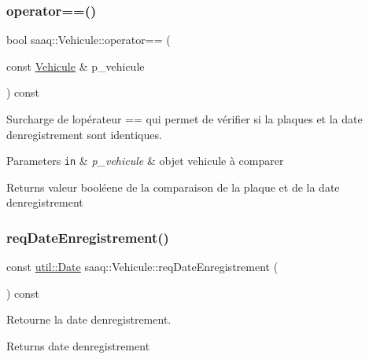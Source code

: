 \subsubsection{\texorpdfstring{operator==()}{operator==()}}
{\footnotesize\ttfamily bool saaq\+::\+Vehicule\+::operator== (\begin{DoxyParamCaption}\item[{const \hyperlink{classsaaq_1_1Vehicule}{Vehicule} \&}]{p\+\_\+vehicule }\end{DoxyParamCaption}) const}



Surcharge de l\textquotesingle{}opérateur == qui permet de vérifier si la plaques et la date d\textquotesingle{}enregistrement sont identiques. 


\begin{DoxyParams}[1]{Parameters}
\mbox{\tt in}  & {\em p\+\_\+vehicule} & objet vehicule à comparer \\
\hline
\end{DoxyParams}
\begin{DoxyReturn}{Returns}
valeur booléene de la comparaison de la plaque et de la date d\textquotesingle{}enregistrement 
\end{DoxyReturn}
\mbox{\label{classsaaq_1_1Vehicule_a650c5f764375e344e268391a5c3cf8b3}} 
\subsubsection{\texorpdfstring{req\+Date\+Enregistrement()}{reqDateEnregistrement()}}
{\footnotesize\ttfamily const \hyperlink{classutil_1_1Date}{util\+::\+Date} saaq\+::\+Vehicule\+::req\+Date\+Enregistrement (\begin{DoxyParamCaption}{ }\end{DoxyParamCaption}) const}



Retourne la date d\textquotesingle{}enregistrement. 

\begin{DoxyReturn}{Returns}
date d\textquotesingle{}enregistrement 
\end{DoxyReturn}
\mbox{\label{classsaaq_1_1Vehicule_a2e8df437d34cc3b3e5008d5a5a819aae}} 
